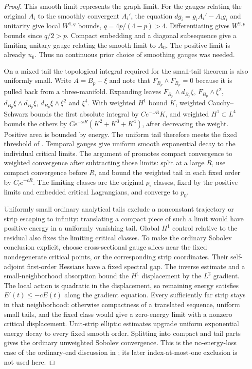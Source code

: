 \documentclass[11pt]{amsart}
\theoremstyle{definition}
\theoremstyle{remark}
\theoremstyle{plain}
\begin{document}
\begin{proof}
This smooth limit represents the graph limit. For the gauges relating
the original $A_i$ to the smoothly convergent $A_i'$, the equation
$dg_i=g_iA_i'-A_i g_i$ and unitarity give local $W^{1,q}$
bounds, $q=4p/(4-p)>4$. Differentiating gives $W^{2,p}$
bounds since $q/2>p$. Compact embedding and a diagonal subsequence
give a limiting unitary gauge relating the smooth limit to $A_0$.
The positive limit is already $u_0$. Thus no continuous prior
choice of smoothing gauges was needed.

On a mixed tail the topological integral required for the small-tail
theorem is also uniformly small. Write $A=B_p+\xi$ and note
that $F_{B_p}\wedge F_{B_p}=0$ because it is pulled back
from a three-manifold. Expanding leaves
$F_{B_p}\wedge d_{B_p}\xi$, $F_{B_p}\wedge\xi^2$,
$d_{B_p}\xi\wedge d_{B_p}\xi$, $d_{B_p}\xi\wedge\xi^2$
and $\xi^4$. With weighted $H^1$ bound $K$, weighted
Cauchy--Schwarz bounds the first absolute integral by
$Ce^{-\omega R}K$, and weighted $H^1\subset L^4$ bounds
the others by $Ce^{-\omega R}(K^2+K^3+K^4)$, after decreasing
the weight. Positive area is bounded by energy. The uniform tail
therefore meets the fixed threshold of
\cite[Proposition~5.29]{DaeFukLip21a}. Temporal gauges give
uniform smooth exponential decay to the individual critical limits.
The argument of \cite[equation~(5.36)]{DaeFukLip21a} promotes
compact convergence to weighted convergence after subtracting those
limits: split at a large $R$, use compact convergence before $R$,
and bound the weighted tail in each fixed order by $C_l e^{-cR}$.
The limiting classes are the original $p_i$ classes, fixed by
the positive limits and embedded critical Lagrangians, and converge
to $p_0$.

Uniformly small ordinary analytical tails exclude a nonconstant
trajectory or strip escaping to infinity: translating a compact piece
of such a limit would have positive energy in a uniformly vanishing
tail. Global $H^1$ control relative to the residual also fixes
the limiting critical classes. To make the ordinary Sobolev conclusion
explicit, choose cross-sectional gauge slices near the fixed
nondegenerate critical points, or the corresponding strip coordinates.
Their self-adjoint first-order Hessians have a fixed spectral gap.
The inverse estimate and a small-neighborhood absorption bound the
$H^1$ displacement by the $L^2$ gradient. The local action
is quadratic in the displacement, so remaining energy satisfies
$E'(t)\leq-cE(t)$ along the gradient equation. Every sufficiently
far strip stays in that neighborhood: otherwise compactness of a
translated sequence, uniform small tails, and the fixed class would
give a zero-energy limit with a nonzero critical displacement.
Unit-strip elliptic estimates upgrade uniform exponential energy
decay to every fixed smooth order. Splitting into compact and tail
parts gives the ordinary unweighted Sobolev convergence. This is the
no-energy-loss case of the ordinary-end discussion in
\cite[Section~5]{DaeFukLip21a}; its later index-at-most-one
exclusion is not used here.


\end{proof}
\end{document}
